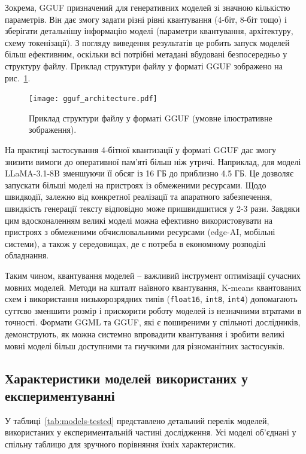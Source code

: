 Зокрема, GGUF призначений для генеративних моделей зі значною кількістю параметрів. Він дає змогу задати різні рівні квантування (4-біт, 8-біт тощо) і зберігати детальнішу інформацію моделі (параметри квантування, архітектуру, схему токенізації). З погляду виведення результатів це робить запуск моделей більш ефективним, оскільки всі потрібні метадані вбудовані безпосередньо у структуру файлу. Приклад структури файлу у форматі GGUF зображено на рис.~\ref{fig:gguf_architecture}.

\begin{figure}[h]
    \centering
    \texttt{[image: gguf\_architecture.pdf]}
    \caption{Приклад структури файлу у форматі GGUF (умовне ілюстративне зображення).}
    \label{fig:gguf_architecture}
\end{figure}

На практиці застосування 4-бітної квантизації у форматі GGUF дає змогу знизити вимоги до оперативної пам’яті більш ніж утричі. Наприклад, для моделі LLaMA-3.1-8B зменшуючи її обсяг із 16 ГБ до приблизно 4.5 ГБ. Це дозволяє запускати більші моделі на пристроях із обмеженими ресурсами. Щодо швидкодії, залежно від конкретної реалізації та апаратного забезпечення, швидкість генерації тексту відповідно може пришвидшитися у 2-3 рази. Завдяки цим вдосконаленням великі моделі можна ефективно використовувати на пристроях з обмеженими обчислювальними ресурсами (edge-AI, мобільні системи), а також у середовищах, де є потреба в економному розподілі обладнання.

Таким чином, квантування моделей -- важливий інструмент оптимізації сучасних мовних моделей. Методи на кшталт наївного квантування, K-means квантованих схем і використання низькорозрядних типів (\texttt{float16}, \texttt{int8}, \texttt{int4}) допомагають суттєво зменшити розмір і прискорити роботу моделей із незначними втратами в точності. Формати GGML та GGUF, які є поширеними у спільноті дослідників, демонструють, як можна системно впровадити квантування і зробити великі мовні моделі більш доступними та гнучкими для різноманітних застосунків.

\subsection{Характеристики моделей використаних у експериментуванні}
\label{sec:models-tested}

У таблиці~\ref{tab:models-tested} представлено детальний перелік моделей, використаних у експериментальній частині дослідження. Усі моделі об'єднані у спільну таблицю для зручного порівняння їхніх характеристик.

